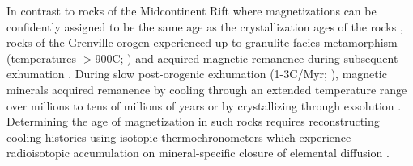 In contrast to rocks of the Midcontinent Rift where magnetizations can be confidently assigned to be the same age as the crystallization ages of the rocks \cite[e.g.][]{Davis1997a,Fairchild2017a,Swanson-Hysell2019a}, rocks of the Grenville orogen experienced up to granulite facies metamorphism (temperatures $>$900\textdegree C; \cite[e.g.][]{Shinevar2021a, Metzger2021a}) and acquired magnetic remanence during subsequent exhumation \citep{McWilliams1975a, Dunlop1985a, Dodson1985a}. During slow post-orogenic exhumation (1-3\textdegree C/Myr; \cite[e.g.][]{Rivers2023a}), magnetic minerals acquired remanence by cooling through an extended temperature range over millions to tens of millions of years \citep{Pullaiah1975a, Dodson1980a} or by crystallizing through exsolution \citep{McEnroe2007a}. Determining the age of magnetization in such rocks requires reconstructing cooling histories using isotopic thermochronometers which experience radioisotopic accumulation on mineral-specific closure of elemental diffusion \citep{Dodson1973a, Dodson1985a}. 

